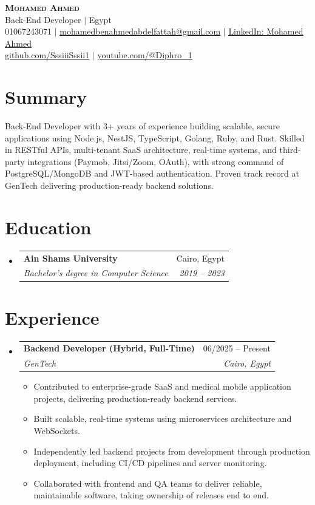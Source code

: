 \documentclass[a4paper,11pt]{article}
\makeatletter
\newcommand{\resumeItem}[1]{
  \item\small{
    {#1 \vspace{-2pt}}
  }
}
\newcommand{\resumeSubheading}[4]{
  \vspace{-2pt}\item
    \begin{tabular*}{0.97\textwidth}[t]{l@{\extracolsep{\fill}}r}
      \textbf{#1} & #2 \\
      \textit{\small#3} & \textit{\small #4} \\
    \end{tabular*}\vspace{-7pt}
}
\newcommand{\resumeSubHeadingListStart}{\begin{itemize}[leftmargin=0.15in, label={}]}
\newcommand{\resumeSubHeadingListEnd}{\end{itemize}}
\newcommand{\resumeItemListStart}{\begin{itemize}}
\newcommand{\resumeItemListEnd}{\end{itemize}\vspace{-5pt}}
\makeatother
\begin{document}
\begin{center}
    \textbf{\Huge \scshape Mohamed Ahmed} \\ \vspace{1pt}
    \small Back-End Developer $|$ Egypt \\ \vspace{1pt}
    01067243071 $|$ \href{mailto:mohamedbenahmedabdelfattah@gmail.com}{\underline{mohamedbenahmedabdelfattah@gmail.com}} $|$
    \href{https://linkedin.com}{\underline{LinkedIn: Mohamed Ahmed}} \\
    \href{https://github.com/SssiiiSssii1}{\underline{github.com/SssiiiSssii1}} $|$
    \href{https://youtube.com/@Diphro_1}{\underline{youtube.com/@Diphro\_1}}
\end{center}


\section{Summary}
\small Back-End Developer with 3+ years of experience building scalable, secure applications using Node.js, NestJS, TypeScript, Golang, Ruby, and Rust. Skilled in RESTful APIs, multi-tenant SaaS architecture, real-time systems, and third-party integrations (Paymob, Jitsi/Zoom, OAuth), with strong command of PostgreSQL/MongoDB and JWT-based authentication. Proven track record at GenTech delivering production-ready backend solutions.


\section{Education}
  \resumeSubHeadingListStart
    \resumeSubheading
      {Ain Shams University}{Cairo, Egypt}
      {Bachelor's degree in Computer Science}{2019 -- 2023}
  \resumeSubHeadingListEnd


\section{Experience}
  \resumeSubHeadingListStart
    \resumeSubheading
      {Backend Developer (Hybrid, Full-Time)}{06/2025 -- Present}
      {GenTech}{Cairo, Egypt}
      \resumeItemListStart
        \resumeItem{Contributed to enterprise-grade SaaS and medical mobile application projects, delivering production-ready backend services.}
        \resumeItem{Built scalable, real-time systems using microservices architecture and WebSockets.}
        \resumeItem{Independently led backend projects from development through production deployment, including CI/CD pipelines and server monitoring.}
        \resumeItem{Collaborated with frontend and QA teams to deliver reliable, maintainable software, taking ownership of releases end to end.}
      \resumeItemListEnd
  \resumeSubHeadingListEnd
\end{document}
